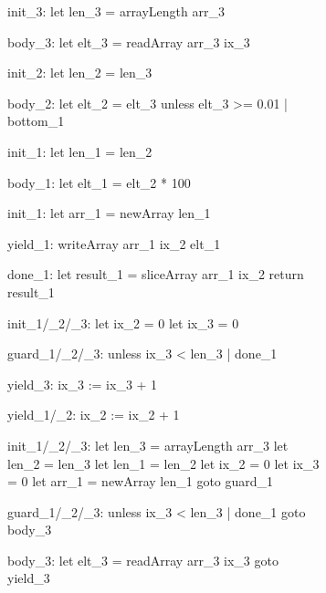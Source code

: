 \documentclass[preamble.tex]{subfiles}
\begin{document}

\begin{figure}
\vspace*{-1cm}
\hspace*{-0.5cm}
\begin{subfigure}{.55\textwidth}
\begin{loopcode}[%
    literate=
        {_1}{{\sub{map}}}3  %
        {_2}{{\sub{filt}}}2 %
        {_3}{{\sub{mfst}}}3 %
]
init_3:
  let len_3 = arrayLength arr_3

body_3:
  let elt_3 = readArray arr_3 ix_3

init_2:
  let len_2 = len_3

body_2:
  let elt_2 = elt_3
  unless elt_3 >= 0.01 | bottom_1

init_1:
  let len_1 = len_2

body_1:
  let elt_1 = elt_2 * 100

init_1:
  let arr_1 = newArray len_1

yield_1:
  writeArray arr_1 ix_2 elt_1

done_1:
  let result_1 = sliceArray arr_1 ix_2
  return result_1

init_1/_2/_3:
  let ix_2 = 0
  let ix_3 = 0

guard_1/_2/_3:
  unless ix_3 < len_3 | done_1

yield_3:
  ix_3 := ix_3 + 1

yield_1/_2:
  ix_2 := ix_2 + 1
\end{loopcode}
\end{subfigure}%
\begin{subfigure}{.55\textwidth}
\begin{loopcode}[%
    literate=
        {_1}{{\sub{map}}}3  %
        {_2}{{\sub{filt}}}2 %
        {_3}{{\sub{mfst}}}3 %
]
init_1/_2/_3:
  let len_3 = arrayLength arr_3
  let len_2 = len_3
  let len_1 = len_2
  let ix_2 = 0
  let ix_3 = 0
  let arr_1 = newArray len_1
  goto guard_1

guard_1/_2/_3:
  unless ix_3 < len_3 | done_1
  goto body_3

body_3:
  let elt_3 = readArray arr_3 ix_3
  goto yield_3


\end{loopcode}
\end{subfigure}
\end{figure}
\end{document}
